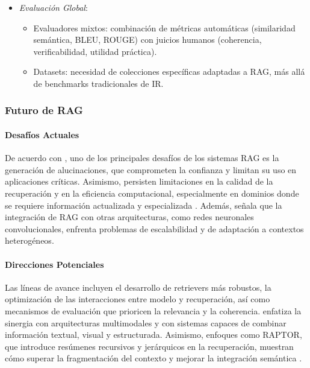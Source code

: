 \begin{itemize}
\begin{itemize}
        \item \textit{Evaluación Global}: 
        \begin{itemize}
            \item Evaluadores mixtos: combinación de métricas automáticas (similaridad semántica, BLEU, ROUGE) con juicios humanos (coherencia, verificabilidad, utilidad práctica).
            \item Datasets: necesidad de colecciones específicas adaptadas a RAG, más allá de benchmarks tradicionales de IR.
        \end{itemize}
    \end{itemize}
    
\end{itemize}


\subsubsection{Futuro de RAG}

\paragraph{Desafíos Actuales}
De acuerdo con \textcite{zhai2024llmIR}, uno de los principales desafíos de los sistemas RAG es la generación de alucinaciones, que comprometen la confianza y 
limitan su uso en aplicaciones críticas. Asimismo, persisten limitaciones en la calidad de la recuperación y en la eficiencia computacional, especialmente 
en dominios donde se requiere información actualizada y especializada \parencite{hu2024ragrau}. Además, \textcite{ramdurai2025llm} señala que la integración de RAG con otras
arquitecturas, como redes neuronales convolucionales, enfrenta problemas de escalabilidad y de adaptación a contextos heterogéneos.

\paragraph{Direcciones Potenciales}  
Las líneas de avance incluyen el desarrollo de retrievers más robustos, la optimización de las interacciones entre modelo y recuperación, 
así como mecanismos de evaluación que prioricen la relevancia y la coherencia. \textcite{ramdurai2025llm} enfatiza la sinergia con arquitecturas multimodales y con sistemas 
capaces de combinar información textual, visual y estructurada. Asimismo, enfoques como RAPTOR, que introduce resúmenes recursivos y jerárquicos en la recuperación,
muestran cómo superar la fragmentación del contexto y mejorar la integración semántica \parencite{sarthi2024raptor}.

